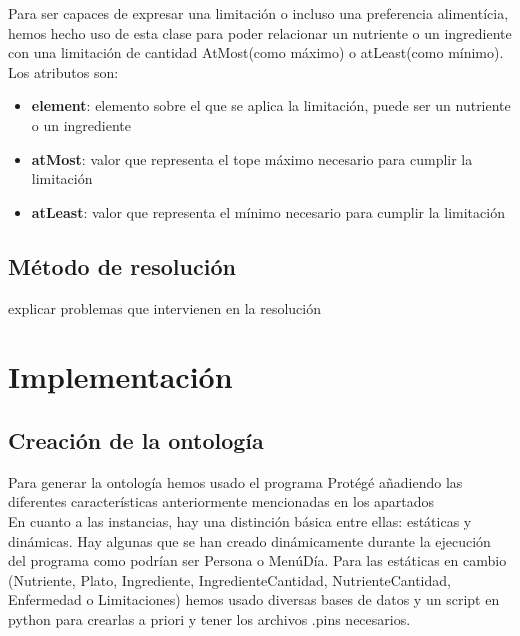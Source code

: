 \documentclass[12]{article}
\begin{document}
Para ser capaces de expresar una limitación o incluso una preferencia alimentícia, hemos hecho uso de esta clase para poder relacionar un nutriente o un ingrediente con una limitación de cantidad AtMost(como máximo) o atLeast(como mínimo).
\\

Los atributos son:
\begin{itemize}
\item \textbf{element}: elemento sobre el que se aplica la limitación, puede ser un nutriente o un ingrediente
\item \textbf{atMost}: valor que representa el tope máximo necesario para cumplir la limitación
\item \textbf{atLeast}: valor que representa el mínimo necesario para cumplir la limitación
\end{itemize}




\subsection{Método de resolución}

 explicar problemas que intervienen en la resolución
\section{Implementación}

\subsection{Creación de la ontología}
Para generar la ontología hemos usado el programa Protégé añadiendo las diferentes características anteriormente mencionadas en los apartados%
\\
En cuanto a las instancias, hay una distinción básica entre ellas: estáticas y dinámicas. Hay algunas que se han creado dinámicamente durante la ejecución del programa como podrían ser Persona o MenúDía. Para las estáticas en cambio (Nutriente, Plato, Ingrediente, IngredienteCantidad, NutrienteCantidad, Enfermedad o Limitaciones) hemos usado diversas bases de datos y un script en python para crearlas a priori y tener los archivos .pins necesarios. 
\end{document}
